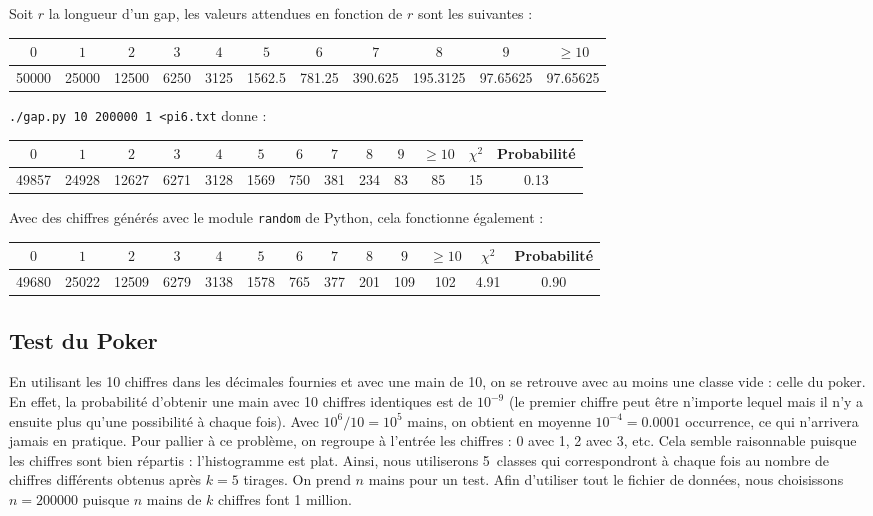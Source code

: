 \documentclass[12pt,a4paper]{article}
\begin{document}
Soit $r$ la longueur d'un gap,
les valeurs attendues en fonction de $r$ sont les suivantes :
\begin{center}
\begin{tabular}{c|c|c|c|c|c|c|c|c|c|c}
$0$ & $1$ & $2$ & $3$ & $4$ & $5$ & $6$ & $7$ & $8$ & $9$ & $\geq 10$ \\ \hline
50000 & 25000 & 12500 & 6250 & 3125 & 1562.5 & 781.25 & 390.625 &
	195.3125 & 97.65625 & 97.65625
\end{tabular}
\end{center}

\texttt{./gap.py 10 200000 1 <pi6.txt} donne :
\begin{center}
\begin{tabular}{c|c|c|c|c|c|c|c|c|c|c|c|c}
$0$ & $1$ & $2$ & $3$ & $4$ & $5$ & $6$ & $7$ & $8$ & $9$ & $\geq 10$ &
	$\chi^2$ & Probabilité \\ \hline
49857 & 24928 & 12627 & 6271 & 3128 & 1569 & 750 & 381 & 234 & 83 & 85 &
	15 &  0.13
\end{tabular}
\end{center}

Avec des chiffres générés avec le module \texttt{random} de Python,
cela fonctionne également :
\begin{center}
\begin{tabular}{c|c|c|c|c|c|c|c|c|c|c|c|c}
$0$ & $1$ & $2$ & $3$ & $4$ & $5$ & $6$ & $7$ & $8$ & $9$ & $\geq 10$ &
	$\chi^2$ & Probabilité \\ \hline
49680 & 25022 & 12509 & 6279 & 3138 & 1578 & 765 & 377 & 201 & 109 & 102 &
	4.91 &  0.90
\end{tabular}
\end{center}


\subsection{Test du Poker}
En utilisant les 10 chiffres dans les décimales fournies et avec une main de 10,
on se retrouve avec au moins une classe vide : celle du poker. En effet, la
probabilité d'obtenir une main avec 10 chiffres identiques est de $10^{-9}$
(le premier chiffre peut être n'importe lequel mais il n'y a ensuite plus
qu'une possibilité à chaque fois). Avec $10^6/10=10^5$ mains, on obtient en
moyenne $10^{-4}=0.0001$ occurrence, ce qui n'arrivera jamais en pratique.
Pour pallier à ce problème, on regroupe à l'entrée les chiffres : 0 avec 1,
2 avec 3, etc. Cela semble raisonnable puisque les chiffres sont bien répartis :
l'histogramme est plat. Ainsi, nous utiliserons 5~classes qui correspondront
à chaque fois au nombre de chiffres différents obtenus après $k=5$ tirages.
On prend $n$ mains pour un test. Afin d'utiliser tout le fichier de données,
nous choisissons $n=200000$ puisque $n$ mains de $k$ chiffres font 1 million.
\end{document}

